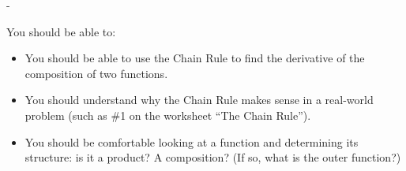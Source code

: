 \documentclass{article}
\makeatletter
\newlength{\tipmargin}
\renewenvironment{framed}{
  \setlength{\tipmargin}{\textwidth-\linewidth}
  \advance\@totalleftmargin-\tipmargin
  \def\FrameCommand{\hspace{\tipmargin}\fbox}%
  \advance\linewidth\tipmargin
  \MakeFramed {\advance\hsize-\width \FrameRestore}%
}
{\endMakeFramed}
\makeatother
\begin{document}
\begin{problemonly}
    \begin{framed}

You should be able to:

\begin{itemize}[topsep=0pt,partopsep=0pt,parsep=8pt,itemsep=0pt]

\item You should be able to use the Chain Rule to find the derivative of
  the composition of two functions.

\item You should understand why the Chain Rule makes sense in a real-world
  problem (such as {{\#1}} on {the worksheet ``The Chain Rule''}).

\item You should be comfortable looking at a function and determining its
  structure: is it a product?  A composition?  (If so, what is the outer
  function?)

\end{itemize} 

    \end{framed}
\end{problemonly}
\end{document}
